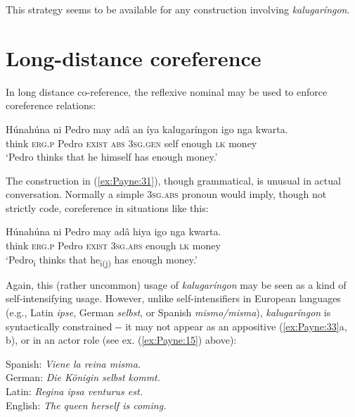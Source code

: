 \documentclass[output=paper]{langscibook}
\begin{document}
This strategy seems to be available for any construction involving \textit{kalugaríngon}.

\section{Long-distance coreference} 
\label{sec:Payne:8}

In long distance co-reference, the reflexive nominal may be used to enforce coreference relations: 

\ea\label{ex:Payne:31}
\gll
Húnahúna ni Pedro may adâ an íya kalugaríngon igo nga kwarta.\\
 think \textsc{erg.p} Pedro \textsc{exist} {}  \textsc{abs} 3\textsc{sg.gen} self enough \textsc{lk} money\\
 \glt ‘Pedro thinks that he himself has enough money.'
\z

The construction in (\ref{ex:Payne:31}), though grammatical, is unusual in actual conversation. Normally a simple 3\textsc{sg.abs} pronoun would imply, though not strictly code, coreference in situations like this:

\ea
\label{ex:Payne:32}
\gll
 Húnahúna ni Pedro may adâ hiya igo nga kwarta.\\
 think \textsc{erg.p} Pedro \textsc{exist} {}  3\textsc{sg.abs} enough \textsc{lk} money\\
 \glt ‘Pedro\textsubscript{i} thinks that he\textsubscript{i(j)} has enough money.'
\z

Again, this (rather uncommon) usage of \textit{kalugaríngon} may be seen as a kind of self-intensifying usage. However, unlike self-intensifiers in European languages (e.g., Latin \textit{ipse}, German \textit{selbst}, or Spanish \textit{mismo/misma}), \textit{kalugaríngon} is syntactically constrained -{}- it may not appear as an appositive (\ref{ex:Payne:33}a, b), or in an actor role (see ex. (\ref{ex:Payne:15}) above):

\ea
\label{ex:Payne:33}
 Spanish: \textit{Viene la reina misma.} \\
 German: \textit{Die Königin selbst kommt.}\\
 Latin: \textit{Regina ipsa venturus est.}\\
 English: \textit{The queen herself is coming.}\\
 
 
\end{document}
